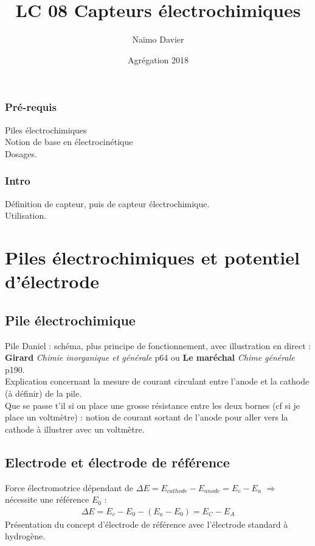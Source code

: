 \documentclass[12pt,prb,aps,epsf]{article}
\begin{document}
	
	\title{LC 08 Capteurs électrochimiques}
		\author{Naïmo Davier}
		\date{Agrégation 2018}
	
	\maketitle
	
	\tableofcontents
	
	\pagebreak
	
\subsubsection{Pré-requis}

 Piles électrochimiques\\
Notion de base en électrocinétique\\
Dosages.
\subsubsection{Intro}

Définition de capteur, puis de capteur électrochimique.\\
Utilisation.

\section{Piles électrochimiques et potentiel d'électrode}
\subsection{Pile électrochimique}
Pile Daniel : schéma, plus principe de fonctionnement, avec illustration en direct : \textbf{Girard} \textit{Chimie inorganique et générale} p64 ou \textbf{Le maréchal} \textit{Chime générale} p190.\\
Explication concernant la mesure de courant circulant entre l'anode et la cathode (à définir) de la pile.\\
Que se passe t'il si on place une grosse résistance entre les deux bornes (cf si je place un voltmètre) : notion de courant sortant de l'anode pour aller vers la cathode à illustrer avec un voltmètre.
\subsection{Electrode et électrode de référence}
Force électromotrice dépendant de $\Delta E = E_{cathode} - E_{anode} = E_c-E_a$ $\Rightarrow$ nécessite une référence $E_0$ :
\begin{eqnarray}
\Delta E = E_c-E_0 - (E_a-E_0) = E_C-E_A
\end{eqnarray}
Présentation du concept d'électrode de référence avec l'électrode standard à hydrogène.
\end{document}

